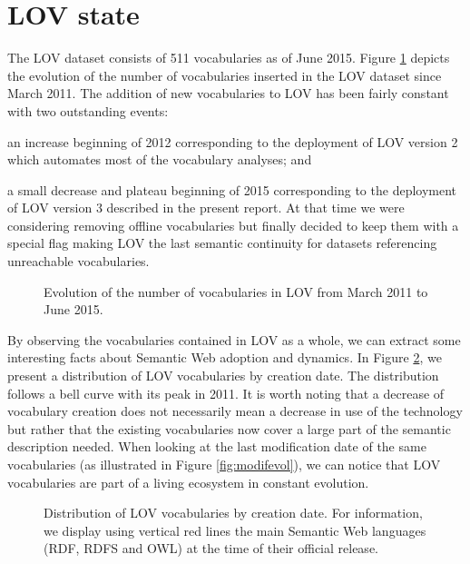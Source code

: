 \documentclass{iosart2c}
\begin{document}
\section{LOV state}\label{sec:state}
The LOV dataset consists of 511 vocabularies as of June 2015. Figure \ref{fig:evolLOV} depicts the evolution of the number of vocabularies inserted in the LOV dataset since March 2011. The addition of new vocabularies to LOV has been fairly constant with two outstanding events: 
\begin{inparaenum}[1)] 
	\item an increase beginning of 2012 corresponding to the deployment of LOV version 2 which automates most of the vocabulary analyses; and
	\item a small decrease and plateau beginning of 2015 corresponding to the deployment of LOV version 3 described in the present report. At that time we were considering  removing offline vocabularies but finally decided to keep them with a special flag making LOV the last semantic continuity for datasets referencing unreachable vocabularies.
\end{inparaenum} 

\begin{figure}[htb]
   \resizebox{1.04\linewidth}{!}{}
   \caption{\label{fig:evolLOV} Evolution of the number of vocabularies in LOV from March 2011 to June 2015.}
\end{figure}



By observing the vocabularies contained in LOV as a whole, we can extract some interesting facts about Semantic Web adoption and dynamics. In Figure \ref{fig:creaevol}, we present a distribution of LOV vocabularies by creation date. The distribution follows a bell curve with its peak in 2011. It is worth noting that a decrease of vocabulary creation does not necessarily mean a decrease in use of the technology but rather that the existing vocabularies now cover a large part of the semantic description needed. When looking at the last modification date of the same vocabularies (as illustrated in Figure \ref{fig:modifevol}), we can notice that LOV vocabularies are part of a living ecosystem in constant evolution. 

\begin{figure}[htb]
\resizebox{\linewidth}{!}{}
\caption{\label{fig:creaevol} Distribution of LOV vocabularies by creation date. For information, we display using vertical red lines the main Semantic Web languages (RDF, RDFS and OWL) at the time of their official release.}
\end{figure}
\end{document}
